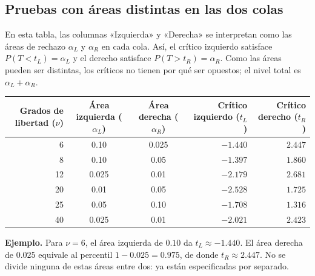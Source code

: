 \documentclass[11pt]{article}
\begin{document}
\subsection{Pruebas con áreas distintas en las dos colas}
En esta tabla, las columnas «Izquierda» y «Derecha» se interpretan como las áreas de rechazo $\alpha_L$ y $\alpha_R$ en cada cola. Así, el crítico izquierdo satisface $P(T<t_L)=\alpha_L$ y el derecho satisface $P(T>t_R)=\alpha_R$. Como las áreas pueden ser distintas, los críticos no tienen por qué ser opuestos; el nivel total es $\alpha_L+\alpha_R$.

\begin{center}
\small
\begin{tabular}{r c c r r}
\toprule
\shortstack{Grados de\\libertad ($\nu$)} & \shortstack{Área\\izquierda ($\alpha_L$)} & \shortstack{Área\\derecha ($\alpha_R$)} & \shortstack{Crítico\\izquierdo ($t_L$)} & \shortstack{Crítico\\derecho ($t_R$)} \\
\midrule
6  & 0.10  & 0.025 & $-1.440$ & $2.447$ \\
8  & 0.10  & 0.05  & $-1.397$ & $1.860$ \\
12 & 0.025 & 0.01  & $-2.179$ & $2.681$ \\
20 & 0.01  & 0.05  & $-2.528$ & $1.725$ \\
25 & 0.05  & 0.10  & $-1.708$ & $1.316$ \\
40 & 0.025 & 0.01  & $-2.021$ & $2.423$ \\
\bottomrule
\end{tabular}
\end{center}

\textbf{Ejemplo.} Para $\nu=6$, el área izquierda de $0.10$ da $t_L\approx-1.440$. El área derecha de $0.025$ equivale al percentil $1-0.025=0.975$, de donde $t_R\approx2.447$. No se divide ninguna de estas áreas entre dos: ya están especificadas por separado.
\end{document}
